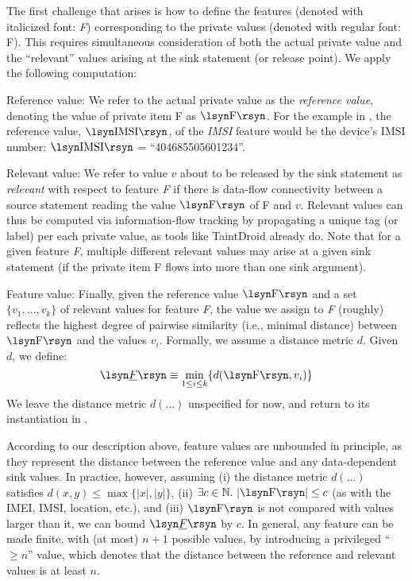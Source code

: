 The first challenge that arises is how to define the features (denoted with italicized font: \emph{F}) corresponding to the private values (denoted with regular font: F). This requires simultaneous consideration of both the actual private value and the ``relevant'' values arising at the sink statement (or release point).
We apply the following computation:
\begin{compactenum}
	\item Reference value: We refer to the actual private value as the \emph{reference value}, denoting the value of private item F as $\lsyn \text{F} \rsyn$. For the example in , the reference value, $\lsyn \text{IMSI} \rsyn$, of the \emph{IMSI} feature would be the
	device's IMSI
	number: $\lsyn \text{IMSI} \rsyn$ = ``404685505601234''.
	\item Relevant value: We refer to value $v$ about to be released by the sink statement as \emph{relevant} with respect to feature \emph{F} if there is data-flow connectivity between a source statement reading the value $\lsyn \text{F} \rsyn$ of F and $v$.
	Relevant values can thus be computed via information-flow tracking by propagating a unique tag (or label) per each private value, as tools like TaintDroid already do. Note that for a given feature \emph{F}, multiple different relevant values may arise
	at a given sink statement (if the private item F flows into more than one sink argument).
	\item Feature value: Finally, given the reference value $\lsyn \text{F} \rsyn$ and a set $\{ v_1,\ldots,v_k \}$ of relevant values for feature \emph{F}, the value we assign to \emph{F} (roughly) reflects the highest degree of pairwise similarity (i.e., minimal distance) between
	$\lsyn \text{F} \rsyn$ and the values $v_i$. Formally, we assume a distance metric $d$. Given $d$, we define:
	$$
		\lsyn \emph{F} \rsyn \equiv \min_{1 \leq i \leq k} \{ d(\lsyn \text{F} \rsyn,v_i) \}
	$$
	We leave the distance metric $d(\ldots)$ unspecified for now, and return to its instantiation in .
\end{compactenum}

According to our description above, feature values are unbounded in principle, as they represent the distance between the reference value and any data-dependent sink values. In practice, however, assuming (i) the distance metric $d(\ldots)$ satisfies $d(x,y) \leq \max \{ |x|,|y| \}$, (ii) $\exists c \in \mathbb{N}.\ | \lsyn \text{F} \rsyn | \leq c$ (as with the IMEI, IMSI, location, etc.), and (iii) $\lsyn \text{F} \rsyn$ is not compared with values larger than it, we can bound $\lsyn \emph{F} \rsyn$ by $c$. In general, any feature can be made finite, with (at most) $n+1$ possible values, by introducing a privileged ``$\geq n$'' value, which denotes that the distance between the reference and relevant values is at least $n$.

